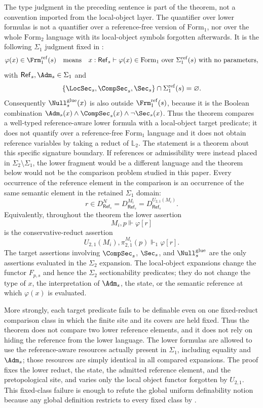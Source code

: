 \begin{theorem}
The type judgment in the preceding sentence is part of the theorem, not a convention imported from the local-object layer. The quantifier over lower formulas is not a quantifier over a reference-free version of $\mathrm{Form}_1$, nor over the whole $\mathrm{Form}_2$ language with its local-object symbols forgotten afterwards. It is the following $\Sigma_1$ judgment fixed in :
\[
\varphi(x)\in\Frm_1^{\mathrm{ref}}(s)
\quad\text{means}\quad
x:\mathsf{Ref}_s\vdash\varphi(x)\in\mathrm{Form}_1
\ \text{over}\ \Sigma_1^{\mathrm{ref}}(s)
\ \text{with no parameters},
\]
with $\mathsf{Ref}_s,\Adm_s\in\Sigma_1$ and
\[
\{\LocSec_s,\CompSec_s,\Sec_s\}
\cap \Sigma_1^{\mathrm{ref}}(s)=\varnothing .
\]
Consequently $\Null_s^{\mathrm{glue}}(x)$ is also outside $\Frm_1^{\mathrm{ref}}(s)$, because it is the Boolean combination $\Adm_s(x)\land\CompSec_s(x)\land\neg\Sec_s(x)$. Thus the theorem compares a well-typed reference-aware lower formula with a local-object target predicate; it does not quantify over a reference-free $\mathrm{Form}_1$ language and it does not obtain reference variables by taking a reduct of $\mathbb L_2$.
The statement is a theorem about this specific signature boundary. If references or admissibility were instead placed in $\Sigma_2\setminus\Sigma_1$, the lower fragment would be a different language and the theorem below would not be the comparison problem studied in this paper.
Every occurrence of the reference element in the comparison is an occurrence of the same semantic element in the retained $\Sigma_1$ domain:
\[
r\in D_{\mathsf{Ref}_s}^{N}
=D_{\mathsf{Ref}_s}^{M_i}
=D_{\mathsf{Ref}_s}^{U_{2,1}(M_i)}.
\]
Equivalently, throughout the theorem the lower assertion
\[
M_i,p\Vdash\varphi[r]
\]
is the conservative-reduct assertion
\[
U_{2,1}(M_i),\pi^{M_i}_{2,1}(p)\Vdash_1\varphi[r].
\]
The target assertions involving $\CompSec_s$, $\Sec_s$, and $\Null_s^{\mathrm{glue}}$ are the only assertions evaluated in the $\Sigma_2$ expansion.
The local-object expansions change the functor $F_{p,s}$ and hence the $\Sigma_2$ sectionability predicates; they do not change the type of $x$, the interpretation of $\Adm_s$, the state, or the semantic reference at which $\varphi(x)$ is evaluated.

More strongly, each target predicate fails to be definable even on one fixed-reduct comparison class in which the finite site and its covers are held fixed. Thus the theorem does not compare two lower reference elements, and it does not rely on hiding the reference from the lower language. The lower formulas are allowed to use the reference-aware resources actually present in $\Sigma_1$, including equality and $\Adm_s$; those resources are simply identical in all compared expansions. The proof fixes the lower reduct, the state, the admitted reference element, and the pretopological site, and varies only the local object functor forgotten by $U_{2,1}$. This fixed-class failure is enough to refute the global uniform definability notion because any global definition restricts to every fixed class by .


\end{theorem}
